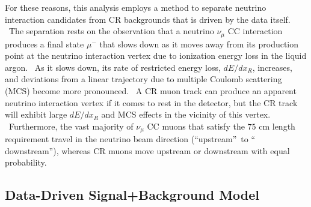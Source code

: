 \documentclass{article}
\begin{document}
For these reasons, this analysis employs a method to separate neutrino
interaction candidates from CR backgrounds that is driven by the data
itself. \ The separation rests on the observation that a neutrino $\nu _{\mu
}$ CC interaction produces a final state $\mu ^{-}$ that slows down as it
moves away from its production point at the neutrino interaction vertex due
to ionization energy loss in the liquid argon. \ As it slows down, its rate
of restricted energy loss, $dE/dx_{R}$, increases, and deviations from a
linear trajectory due to multiple Coulomb scattering (MCS) become more
pronounced. \ A CR muon track can produce an apparent neutrino interaction
vertex if it comes to rest in the detector, but the CR track will exhibit
large $dE/dx_{R}$ and MCS effects in the vicinity of this vertex. \
Furthermore, the vast majority of $\nu _{\mu }$ CC muons that satisfy the $75$
cm length requirement travel in the neutrino beam direction
(\textquotedblleft upstream\textquotedblright\ to \textquotedblleft
downstream\textquotedblright ), whereas CR muons move upstream or downstream
with equal probability.

\subsection{Data-Driven Signal+Background Model}
\end{document}

